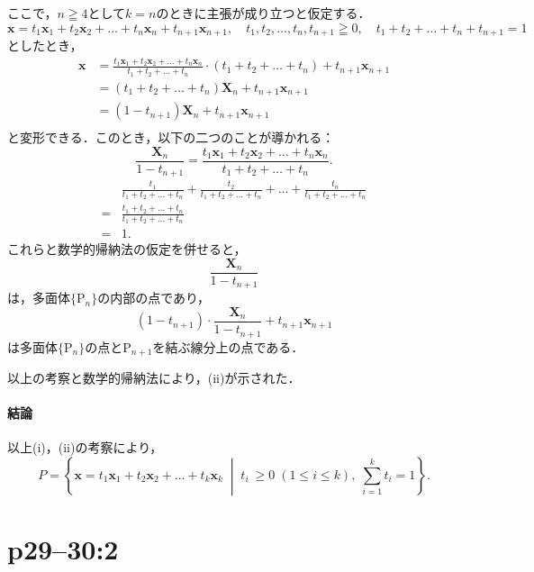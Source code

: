 \begin{tproof}
  ここで，$n \geqq 4$として$k=n$のときに主張が成り立つと仮定する．
  \[
    \bm{x} = t_1 \bm{x}_1 + t_2 \bm{x}_2 + \dots + t_n \bm{x}_n + t_{n+1} \bm{x}_{n+1} , \quad t_1, t_2 ,\dots , t_n,t_{n+1} \geqq 0 ,\quad  t_1 +t_2 + \dots+t_n + t_{n+1} =1
  \]
  としたとき，
  \begin{align*}
    \bm{x} & =\frac{t_1 \bm{x}_1 + t_2 \bm{x}_2+\dots+ t_n \bm{x}_n}{t_1+t_2+\dots+t_n} \cdot (t_1+t_2+\dots+t_n) +t_{n+1} \bm{x}_{n+1} \\
           & = (t_1 +t_2 + \dots +t_n) \bm{X}_n + t_{n+1} \bm{x}_{n+1}                                                                  \\
           & = (1-t_{n+1}) \bm{X}_n + t_{n+1} \bm{x}_{n+1}                                                                              \\
  \end{align*}
  と変形できる．このとき，以下の二つのことが導かれる：
  \[
    \frac{\bm{X}_n }{1-t_{n+1}} = \frac{t_1 \bm{x}_1 + t_2 \bm{x}_2+\dots+ t_n \bm{x}_n}{t_1+t_2+\dots+t_n}.
  \]
  \begin{align*}
      & \frac{t_1}{t_1+t_2+\dots+t_n}+\frac{t_2 }{t_1+t_2+\dots+t_n} +\dots +\frac{t_n }{t_1+t_2+\dots+t_n} \\
    = & \frac{t_1+t_2+\dots+t_n}{t_1+t_2+\dots+t_n}                                                         \\
    = & 1.
  \end{align*}
  これらと数学的帰納法の仮定を併せると，
  \[
    \frac{\bm{X}_n}{1-t_{n+1}}
  \]
  は，多面体$\{ \mathrm{P}_n \}$の内部の点であり，
  \[
    (1-t_{n+1}) \cdot \frac{\bm{X}_n}{1-t_{n+1}} + t_{n+1} \bm{x}_{n+1}
  \]
  は多面体$\{ \mathrm{P}_n \}$の点と$\mathrm{P}_{n+1}$を結ぶ線分上の点である．

  以上の考察と数学的帰納法により，(ii)が示された．
  \paragraph{結論}
  以上(i)，(ii)の考察により，
  \[
    P=\left\{\bm{x}=t_1 \bm{x}_1+t_2\bm{x}_2+\dots+t_k\bm{x}_k\; \middle| \;t_i\ \ge 0\;(1\le i\le k),\;\sum_{i=1}^k t_i=1\right\}.
  \]
\end{tproof}

\section*{p29--30:2}


